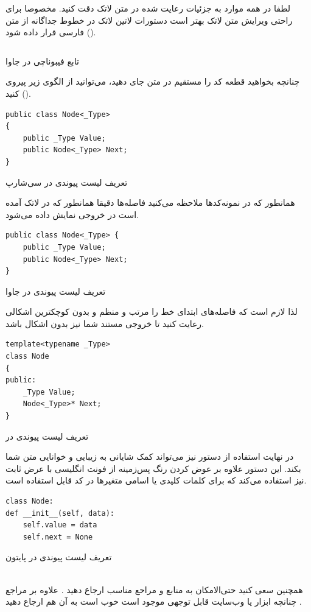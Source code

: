 لطفا در همه موارد به جزئیات رعایت شده در متن لاتک دقت کنید. مخصوصا برای راحتی ویرایش متن لاتک بهتر است دستورات لاتین لاتک در خطوط جداگانه از متن فارسی قرار داده شود ().

\begin{program}[H]
\inputminted[frame=none]{java}{Sample.java}
\caption{تابع فیبوناچی در جاوا }
\label{javafib}
\end{program}
 چنانچه بخواهید قطعه کد را مستقیم در متن جای دهید، می‌توانید از الگوی زیر پیروی کنید ().
 
\begin{program}[H]
\begin{verbatim}
public class Node<_Type>
{
    public _Type Value;
    public Node<_Type> Next;
}
\end{verbatim}
\caption{تعریف لیست پیوندی در سی‌شارپ}
\label{csharpnode}
\end{program}
 
همانطور که در نمونه‌کدها ملاحظه می‌کنید فاصله‌ها دقیقا همانطور که در لاتک آمده است در خروجی نمایش داده می‌شود.
 
\begin{program}[H]
\begin{verbatim}
public class Node<_Type> {
    public _Type Value;
    public Node<_Type> Next;
}
\end{verbatim}
\label{javanode}
\caption{تعریف لیست پیوندی در ‌جاوا}
\end{program}

لذا لازم است که فاصله‌های ابتدای خط را مرتب و منظم و بدون کوچکترین اشکالی رعایت کنید تا خروجی مستند شما نیز بدون اشکال باشد.

\begin{program}[H]
\begin{verbatim}
template<typename _Type>
class Node
{
public:
    _Type Value;
    Node<_Type>* Next;
}
\end{verbatim}
\label{cppnode}
\caption{تعریف لیست پیوندی در ‌}
\end{program}
در نهایت استفاده از دستور 
نیز می‌تواند کمک شایانی به زیبایی و خوانایی متن شما بکند. این دستور علاوه بر عوض کردن رنگ پس‌زمینه از فونت انگلیسی با عرض ثابت نیز استفاده می‌کند که برای کلمات کلیدی یا اسامی متغیرها در کد قابل استفاده است.

\begin{program}[H]
\begin{verbatim}
class Node: 
def __init__(self, data): 
    self.value = data
    self.next = None  
\end{verbatim}
\label{pythonnode}
\caption{تعریف لیست پیوندی در ‌پایتون}
\end{program}

\\
همچنین سعی کنید حتی‌الامکان به منابع و مراحع مناسب ارجاع دهید
\cite{CLRS}. 
علاوه بر مراجع چنانچه ابزار یا وب‌سایت قابل توجهی موجود است خوب است به آن هم ارجاع دهید
\cite{visualizationwebsite}. 

